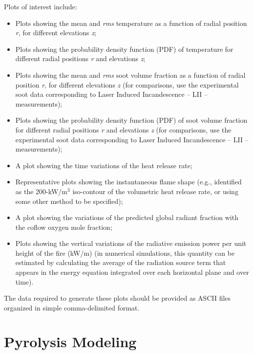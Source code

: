 \documentclass[12pt]{article}
\begin{document}
\newpage
Plots of interest include:
\begin{itemize}[noitemsep]
\item Plots showing the mean and {\it rms} temperature as a function of radial position {\it r}, for different elevations {\it z};
\item Plots showing the probability density function (PDF) of temperature for different radial positions {\it r} and elevations {\it z};
\item Plots showing the mean and {\it rms} soot volume fraction as a function of radial position {\it r}, for different elevations {\it z} (for comparisons, use the experimental soot data corresponding to Laser Induced Incandescence -- LII -- measurements);
\item Plots showing the probability density function (PDF) of soot volume fraction for different radial positions {\it r} and elevations {\it z} (for comparisons, use the experimental soot data corresponding to Laser Induced Incandescence -- LII -- measurements);
\item A plot showing the time variations of the heat release rate;
\item Representative plots showing the instantaneous flame shape (e.g., identified as the 200-kW/m$^3$ iso-contour of the volumetric heat release rate, or using some other method to be specified);
\item A plot showing the variations of the predicted global radiant fraction with the coflow oxygen mole fraction;
\item Plots showing the vertical variations of the radiative emission power per unit height of the fire (kW/m) (in numerical simulations, this quantity can be estimated by calculating the average of the radiation source term that appears in the energy equation integrated over each horizontal plane and over time).
 \end{itemize}

 The data required to generate these plots should be provided as ASCII files organized in simple comma-delimited format.


\clearpage
\section{Pyrolysis Modeling}
\label{Sec:Pyrolysis}
\end{document}
